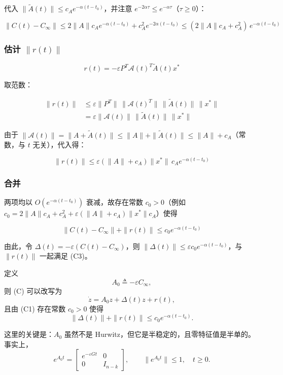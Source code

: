 \documentclass[UTF8,fontset=fandol]{ctexart}
\begin{document}
代入 $\|\tilde{A}(t)\|\leq c_A e^{-\alpha(t-t_0)}$，并注意 $e^{-2\alpha\tau}\leq e^{-\alpha\tau}$（$\tau\geq0$）：

\[
\|C(t)-C_\infty\|
\leq 2\|A\|c_A e^{-\alpha(t-t_0)} + c_A^2 e^{-2\alpha(t-t_0)}
\leq (2\|A\|c_A + c_A^2)\, e^{-\alpha(t-t_0)}
\]

\subsubsection*{估计 $\|r(t)\|$}

\[
r(t) = -\varepsilon P^T\mathcal{A}(t)^T\tilde{A}(t)x^*
\]

取范数：

\[
\begin{aligned}
\|r(t)\|
&\leq \varepsilon \|P^T\|\,\|\mathcal{A}(t)^T\|\,\|\tilde{A}(t)\|\,\|x^*\| \\
&= \varepsilon \|\mathcal{A}(t)\|\,\|\tilde{A}(t)\|\,\|x^*\|
\end{aligned}
\]

由于 $\|\mathcal{A}(t)\| = \|A+\tilde{A}(t)\| \leq \|A\| + \|\tilde{A}(t)\| \leq \|A\| + c_A$（常数，与 $t$ 无关），代入得：

\[
\|r(t)\| \leq \varepsilon(\|A\|+c_A)\|x^*\|\,c_A e^{-\alpha(t-t_0)}
\]

\subsubsection*{合并}

两项均以 $O(e^{-\alpha(t-t_0)})$ 衰减，故存在常数 $c_0>0$（例如 $c_0 = 2\|A\|c_A + c_A^2 + \varepsilon(\|A\|+c_A)\|x^*\|c_A$）使得

\[
\|C(t)-C_\infty\| + \|r(t)\| \leq c_0 e^{-\alpha(t-t_0)}
\]

由此，令 $\Delta(t) = -\varepsilon(C(t)-C_\infty)$，则 $\|\Delta(t)\| \leq \varepsilon c_0 e^{-\alpha(t-t_0)}$，与 $\|r(t)\|$ 一起满足 (C3)。

定义
\[
A_0\triangleq-\varepsilon C_\infty,
\]
则 (C) 可以改写为
\begin{equation}
\dot{z}=A_0z+\Delta(t)z+r(t),
\tag{C2}
\end{equation}
且由 (C1) 存在常数 $c_0>0$ 使得
\[
\|\Delta(t)\|+\|r(t)\|
\leq c_0e^{-\alpha(t-t_0)}. \tag{C3}
\]

这里的关键是：$A_0$ 虽然不是 Hurwitz，但它是半稳定的，且零特征值是半单的。
事实上，
\[
e^{A_0t}
=
\begin{bmatrix}
e^{-\varepsilon Gt}&0\\
0&I_{n-k}
\end{bmatrix},
\qquad
\|e^{A_0t}\|\leq1,\quad t\geq0. \tag{C4}
\]
\end{document}
